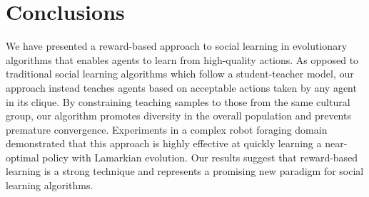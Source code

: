 \documentclass{acm_proc_article-sp}
\begin{document}
\section{Conclusions}
\label{sec:conclusions}

We have presented a reward-based approach to social learning in evolutionary algorithms that enables agents to learn from high-quality actions. As opposed to traditional social learning algorithms which follow a student-teacher model, our approach instead teaches agents based on acceptable actions taken by any agent in its clique. By constraining teaching samples to those from the same cultural group, our algorithm promotes diversity in the overall population and prevents premature convergence. Experiments in a complex robot foraging domain demonstrated that this approach is highly effective at quickly learning a near-optimal policy with Lamarkian evolution. Our results suggest that reward-based learning is a strong technique and represents a promising new paradigm for social learning algorithms.



\end{document}
